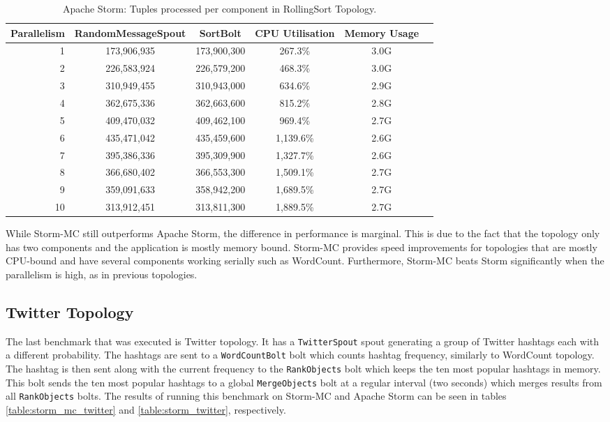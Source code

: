 \begin{table}[!htb]
\begin{adjustwidth}{-0.5in}{-0.5in}
\centering
\small
\begin{tabular}{@{}rccccl@{}}
    {Parallelism} & {RandomMessageSpout} & {SortBolt} & {CPU Utilisation} & {Memory Usage} \\ \toprule
    1 & {173,906,935} & {173,900,300} & {267.3\%} & {3.0G} \\
    2 & {226,583,924} & {226,579,200} & {468.3\%} & {3.0G} \\
    3 & {310,949,455} & {310,943,000} & {634.6\%} & {2.9G} \\
    4 & {362,675,336} & {362,663,600} & {815.2\%} & {2.8G} \\
    5 & {409,470,032} & {409,462,100} & {969.4\%} & {2.7G} \\
    6 & {435,471,042} & {435,459,600} & {1,139.6\%} & {2.6G} \\
    7 & {395,386,336} & {395,309,900} & {1,327.7\%} & {2.6G} \\
    8 & {366,680,402} & {366,553,300} & {1,509.1\%} & {2.7G} \\
    9 & {359,091,633} & {358,942,200} & {1,689.5\%} & {2.7G} \\
    10 & {313,912,451} & {313,811,300} & {1,889.5\%} & {2.7G} \\
\end{tabular}
\caption{Apache Storm: Tuples processed per component in RollingSort Topology.}
\label{table:storm_rolling}
\end{adjustwidth}
\end{table}

While Storm-MC still outperforms Apache Storm, the difference in performance is marginal. This is due to the fact that the topology only has two components and the application is mostly memory bound. Storm-MC provides speed improvements for topologies that are mostly CPU-bound and have several components working serially such as WordCount. Furthermore, Storm-MC beats Storm significantly when the parallelism is high, as in previous topologies.

\subsection{Twitter Topology}

The last benchmark that was executed is Twitter topology. It has a \texttt{TwitterSpout} spout generating a group of Twitter hashtags each with a different probability. The hashtags are sent to a \texttt{WordCountBolt}  bolt which counts hashtag frequency, similarly to WordCount topology. The hashtag is then sent along with the current frequency to the \texttt{RankObjects} bolt which keeps the ten most popular hashtags in memory. This bolt sends the ten most popular hashtags to a global \texttt{MergeObjects} bolt at a regular interval (two seconds) which merges results from all \texttt{RankObjects} bolts. The results of running this benchmark on Storm-MC and Apache Storm can be seen in tables \ref{table:storm_mc_twitter} and \ref{table:storm_twitter}, respectively.

